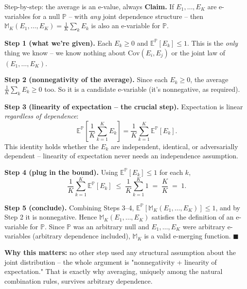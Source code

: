 \documentclass[aspectratio=169,10pt]{beamer}
\newcommand{\E}{\mathbb{E}}
\newcommand{\Pb}{\mathbb{P}}
\begin{document}
\begin{frame}[allowframebreaks]{Step-by-step: the average is an e-value, always}
  \textbf{Claim.} If $E_1,\dots,E_K$ are e-variables for a null $\Pb$ -- with \emph{any} joint dependence structure -- then $\mathbb{M}_K(E_1,\dots,E_K) = \tfrac{1}{K}\sum_k E_k$ is also an e-variable for $\Pb$.

  \vspace{0.2cm}
  \textbf{Step 1 (what we're given).} Each $E_k \geq 0$ and $\E^{\Pb}[E_k] \leq 1$. This is the \emph{only} thing we know -- we know nothing about $\mathrm{Cov}(E_i,E_j)$ or the joint law of $(E_1,\dots,E_K)$.

  \textbf{Step 2 (nonnegativity of the average).} Since each $E_k \geq 0$, the average $\tfrac{1}{K}\sum_k E_k \geq 0$ too. So it is a candidate e-variable (it's nonnegative, as required).

  \textbf{Step 3 (linearity of expectation -- the crucial step).} Expectation is linear \emph{regardless of dependence}:
  \[
    \E^{\Pb}\!\left[\frac{1}{K}\sum_{k=1}^K E_k\right] = \frac{1}{K}\sum_{k=1}^K \E^{\Pb}[E_k].
  \]
  This identity holds whether the $E_k$ are independent, identical, or adversarially dependent -- linearity of expectation never needs an independence assumption.

  \framebreak

  \textbf{Step 4 (plug in the bound).} Using $\E^{\Pb}[E_k]\leq 1$ for each $k$,
  \[
    \frac{1}{K}\sum_{k=1}^K \E^{\Pb}[E_k] \;\leq\; \frac{1}{K}\sum_{k=1}^K 1 \;=\; \frac{K}{K} \;=\; 1.
  \]

  \textbf{Step 5 (conclude).} Combining Steps 3--4, $\E^{\Pb}\!\left[\mathbb{M}_K(E_1,\dots,E_K)\right] \leq 1$, and by Step 2 it is nonnegative. Hence $\mathbb{M}_K(E_1,\dots,E_K)$ satisfies the definition of an e-variable for $\Pb$. Since $\Pb$ was an arbitrary null and $E_1,\dots,E_K$ were arbitrary e-variables (arbitrary dependence included), $\mathbb{M}_K$ is a valid e-merging function. $\blacksquare$

  \vspace{0.2cm}
  \textbf{Why this matters:} no other step used any structural assumption about the joint distribution -- the whole argument is "nonnegativity + linearity of expectation." That is exactly why averaging, uniquely among the natural combination rules, survives arbitrary dependence.
\end{frame}
\end{document}
